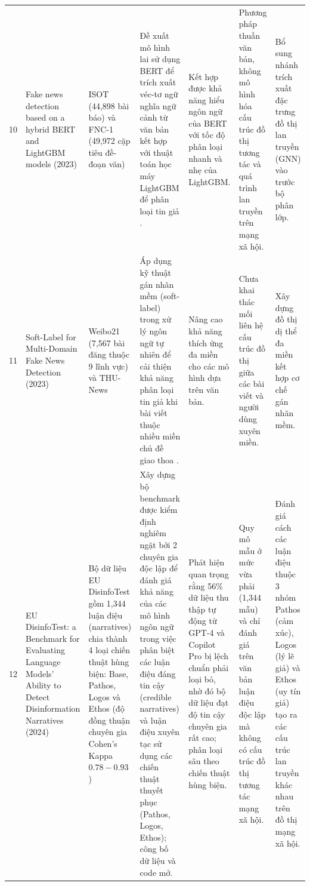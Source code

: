 \documentclass[11pt,a4paper]{extreport}
\begin{document}
\begin{landscape}
\begin{longtable}{@{}C{0.6cm}p{3.6cm}p{2.7cm}p{4.8cm}p{3.6cm}p{3.6cm}p{3.6cm}@{}}
10 & Fake news detection based on a hybrid BERT and LightGBM models (2023) \cite{noauthor_fake_2023-1} & ISOT (44,898 bài báo) và FNC-1 (49,972 cặp tiêu đề-đoạn văn) & Đề xuất mô hình lai sử dụng BERT để trích xuất véc-tơ ngữ nghĩa ngữ cảnh từ văn bản kết hợp với thuật toán học máy LightGBM để phân loại tin giả \cite{noauthor_fake_2023-1}. & Kết hợp được khả năng hiểu ngôn ngữ của BERT với tốc độ phân loại nhanh và nhẹ của LightGBM. & Phương pháp thuần văn bản, không mô hình hóa cấu trúc đồ thị tương tác và quá trình lan truyền trên mạng xã hội. & Bổ sung nhánh trích xuất đặc trưng đồ thị lan truyền (GNN) vào trước bộ phân lớp. \\ 

11 & Soft-Label for Multi-Domain Fake News Detection (2023) \cite{noauthor_soft-label_2023} & Weibo21 (7,567 bài đăng thuộc 9 lĩnh vực) và THU-News & Áp dụng kỹ thuật gán nhãn mềm (soft-label) trong xử lý ngôn ngữ tự nhiên để cải thiện khả năng phân loại tin giả khi bài viết thuộc nhiều miền chủ đề giao thoa \cite{noauthor_soft-label_2023}. & Nâng cao khả năng thích ứng đa miền cho các mô hình dựa trên văn bản. & Chưa khai thác mối liên hệ cấu trúc đồ thị giữa các bài viết và người dùng xuyên miền. & Xây dựng đồ thị dị thể đa miền kết hợp cơ chế gán nhãn mềm. \\ 

12 & EU DisinfoTest: a Benchmark for Evaluating Language Models’ Ability to Detect Disinformation Narratives (2024) \cite{noauthor_eu_2024} & Bộ dữ liệu EU DisinfoTest gồm 1,344 luận điệu (narratives) chia thành 4 loại chiến thuật hùng biện: Base, Pathos, Logos và Ethos (độ đồng thuận chuyên gia Cohen's Kappa $0.78 - 0.93$) & Xây dựng bộ benchmark được kiểm định nghiêm ngặt bởi 2 chuyên gia độc lập để đánh giá khả năng của các mô hình ngôn ngữ trong việc phân biệt các luận điệu đáng tin cậy (credible narratives) và luận điệu xuyên tạc sử dụng các chiến thuật thuyết phục (Pathos, Logos, Ethos); công bố dữ liệu và code mở. & Phát hiện quan trọng rằng 56\% dữ liệu thu thập tự động từ GPT-4 và Copilot Pro bị lệch chuẩn phải loại bỏ, nhờ đó bộ dữ liệu đạt độ tin cậy chuyên gia rất cao; phân loại sâu theo chiến thuật hùng biện. & Quy mô mẫu ở mức vừa phải (1,344 mẫu) và chỉ đánh giá trên văn bản luận điệu độc lập mà không có cấu trúc đồ thị tương tác mạng xã hội. & Đánh giá cách các luận điệu thuộc 3 nhóm Pathos (cảm xúc), Logos (lý lẽ giả) và Ethos (uy tín giả) tạo ra các cấu trúc lan truyền khác nhau trên đồ thị mạng xã hội. \\ 


\end{longtable}
\end{landscape}
\end{document}
